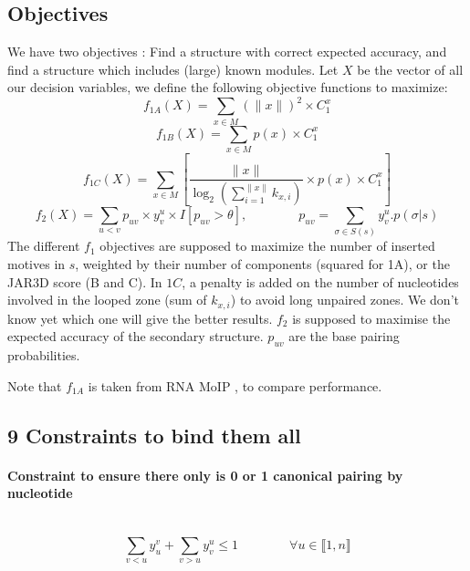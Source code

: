 \documentclass{article}
\begin{document}
\subsection{Objectives \label{objectives}}
We have two objectives : Find a structure with correct expected accuracy, and find a structure which includes (large) known modules.
Let $X$ be the vector of all our decision variables, we define the following objective functions to maximize:
\[ f_{1A}(X) = \sum_{x \in M} (\|x\|)^2 \times C^x_1  \]
\[ f_{1B}(X) = \sum_{x \in M} p(x) \times C^x_1 \]
\[ f_{1C}(X) = \sum_{x \in M} \left[ \frac{\|x\|}{\log_2(\sum_{i=1}^{\|x\|}k_{x,i})} \times p(x) \times C^x_1 \right]\]
$$ f_2(X) = \sum_{u<v} p_{uv}\times y^u_v \times I[p_{uv}>\theta], \qquad \qquad
	p_{uv} = \sum_{\sigma \in S(s)} y^u_v.p(\sigma | s)$$
The different $f_1$ objectives are supposed to maximize the number of inserted motives in $s$, 
weighted by their number of components (squared for 1A), or the JAR3D score (B and C). 
In $1C$, a penalty is added on the number of nucleotides involved in the looped zone (sum of $k_{x,i}$) to avoid long unpaired zones. 
We don't know yet which one will give the better results.
$f_2$ is supposed to maximise the expected accuracy of the secondary structure. 
$p_{uv}$ are the base pairing probabilities.

Note that \(f_{1A}\) is taken from RNA MoIP \cite{reinharz_towards_2012}, to compare performance.

\subsection{9 Constraints to bind them all}
\paragraph{Constraint to ensure there only is 0 or 1 canonical pairing by nucleotide} ~ 
\begin{equation} \label{constraint:1}
	\sum_{v<u} y^v_u + \sum_{v>u} y^u_v \leq 1 \qquad\qquad \forall u \in \llbracket 1,n \rrbracket
\end{equation}
\end{document}
